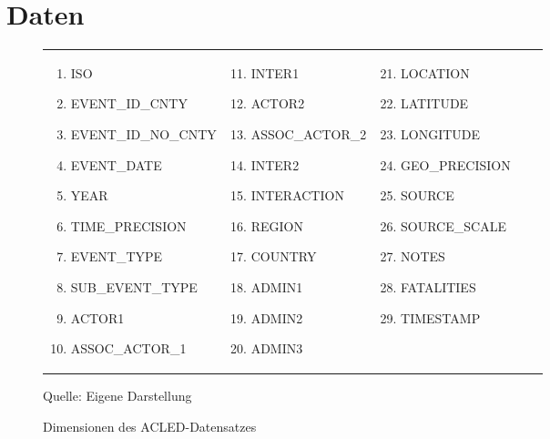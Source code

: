 \documentclass[usegeometry=true]{scrartcl}
\begin{document}
\section{Daten}
\begin{figure}[]
\begin{center}

\begin{tabular}{lllll}
 \parbox{5.5cm}{
 \begin{enumerate}
  \item ISO
  \item EVENT\_ID\_CNTY
  \item EVENT\_ID\_NO\_CNTY
  \item EVENT\_DATE
  \item YEAR
  \item TIME\_PRECISION
  \item EVENT\_TYPE
  \item SUB\_EVENT\_TYPE
  \item ACTOR1
  \item ASSOC\_ACTOR\_1
 \end{enumerate}}
 &
 \parbox{4.5cm}{
 \begin{enumerate}
 \setcounter{enumi}{10}
  \item INTER1
  \item ACTOR2
  \item ASSOC\_ACTOR\_2
  \item INTER2
  \item INTERACTION
  \item REGION
  \item COUNTRY
  \item ADMIN1
  \item ADMIN2
  \item ADMIN3
 \end{enumerate}}
 &
 \parbox{5cm}{
 \begin{enumerate}
 \setcounter{enumi}{20}
  \item LOCATION
  \item LATITUDE
  \item LONGITUDE
  \item GEO\_PRECISION
  \item SOURCE
  \item SOURCE\_SCALE
  \item NOTES
  \item FATALITIES
  \item TIMESTAMP
 \end{enumerate}}

\end{tabular}

\caption{Dimensionen des ACLED-Datensatzes}
Quelle: Eigene Darstellung
\label{dimensions}
\end{center}
\end{figure}
\end{document}
